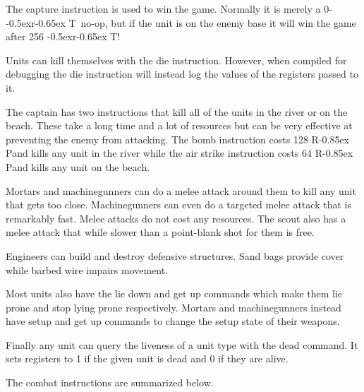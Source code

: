 \documentclass{article}
\newcommand{\RT}{\lower-0.5ex\hbox{r}\kern-0.65ex T}
\newcommand{\RP}{R\kern-0.85ex P}
\begin{document}
The capture instruction is used to win the game. Normally it is merely a 0-\RT\
no-op, but if the unit is on the enemy base it will win the game after 256 \RT!

Units can kill themselves with the die instruction. However, when compiled for
debugging the die instruction will instead log the values of the registers
passed to it.

The captain has two instructions that kill all of the units in the river or on
the beach. These take a long time and a lot of resources but can be very
effective at preventing the enemy from attacking. The bomb instruction costs 128
\RP and kills any unit in the river while the air strike instruction costs 64
\RP and kills any unit on the beach.

Mortars and machinegunners can do a melee attack around them to kill any unit
that gets too close. Machinegunners can even do a targeted melee attack that
is remarkably fast. Melee attacks do not cost any resources. The scout also has
a melee attack that while slower than a point-blank shot for them is free.

Engineers can build and destroy defensive structures. Sand bags provide cover
while barbed wire impairs movement.

Most units also have the lie down and get up commands which make them lie prone
and stop lying prone respectively. Mortars and machinegunners instead have setup
and get up commands to change the setup state of their weapons.

Finally any unit can query the liveness of a unit type with the dead command. It
sets registers to 1 if the given unit is dead and 0 if they are alive.

The combat instructions are summarized below.
\end{document}
